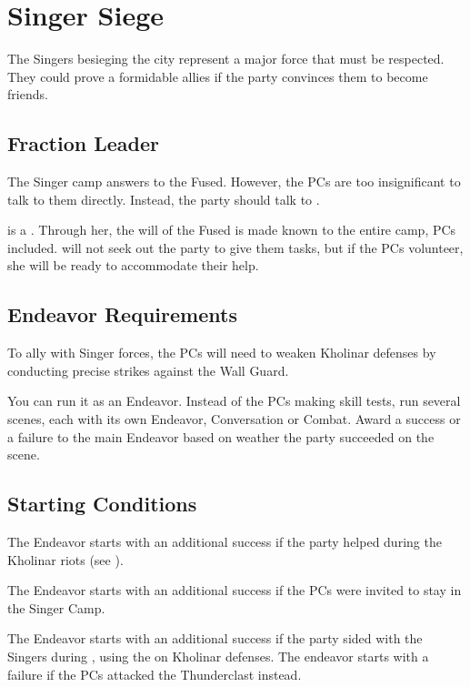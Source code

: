 \section{Singer Siege}
\label{sec:singerSiege}

The Singers besieging the city represent a major force that must be respected. They could prove a formidable allies if the party convinces them to become friends.




\subsection{Fraction Leader}

The Singer camp answers to the Fused. However, the PCs are too insignificant to talk to them directly. Instead, the party should talk to \npcSingerEnvoy{}.

\npcSingerEnvoy[s]{} is a \enemySingerEnvoyform{}. Through her, the will of the Fused is made known to the entire camp, PCs included. \npcSingerEnvoy{} will not seek out the party to give them tasks, but if the PCs volunteer, she will be ready to accommodate their help.


\subsection{Endeavor Requirements}

To ally with Singer forces, the PCs will need to weaken Kholinar defenses by conducting precise strikes against the Wall Guard.

You can run it as an Endeavor. Instead of the PCs making skill tests, run several scenes, each with its own Endeavor, Conversation or Combat. Award a success or a failure to the main Endeavor based on weather the party succeeded on the scene.



\subsection{Starting Conditions}

The Endeavor starts with an additional success if the party helped \npcSingerWouned{} during the Kholinar riots (see ).

The Endeavor starts with an additional success if the PCs were invited to stay in the Singer Camp.

The Endeavor starts with an additional success if the party sided with the Singers during , using the \lootDustcaster{} on Kholinar defenses. The endeavor starts with a failure if the PCs attacked the Thunderclast instead.


